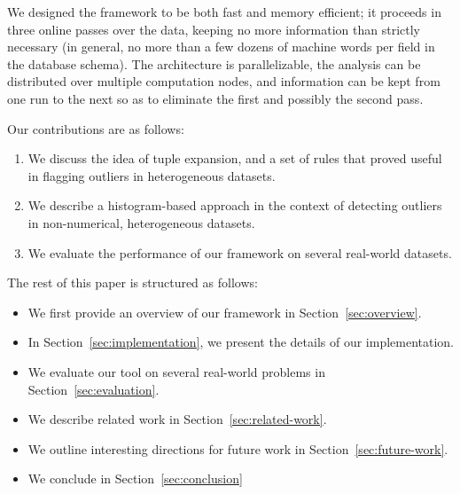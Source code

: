 We designed the framework to be both fast and memory efficient; it proceeds in three online passes over the data, keeping no more information than strictly necessary (in general, no more than a few dozens of machine words per field in the database schema). The architecture is parallelizable, the analysis can be distributed over multiple computation nodes, and information can be kept from one run to the next so as to eliminate the first and possibly the second pass.

Our contributions are as follows:
\begin{enumerate}
\item We discuss the idea of tuple expansion, and a set of rules that proved useful in flagging outliers in heterogeneous datasets.
\item We describe a histogram-based approach in the context of detecting outliers in non-numerical, heterogeneous datasets.
\item We evaluate the performance of our framework on several real-world datasets.
\end{enumerate}

The rest of this paper is structured as follows:
\begin{itemize}
\item We first provide an overview of our framework in Section~\ref{sec:overview}.
\item In Section~\ref{sec:implementation}, we present the details of our implementation.
\item We evaluate our tool on several real-world problems in Section~\ref{sec:evaluation}.
\item We describe related work in Section~\ref{sec:related-work}.
\item We outline interesting directions for future work in Section~\ref{sec:future-work}.
\item We conclude in Section~\ref{sec:conclusion}
\end{itemize}
